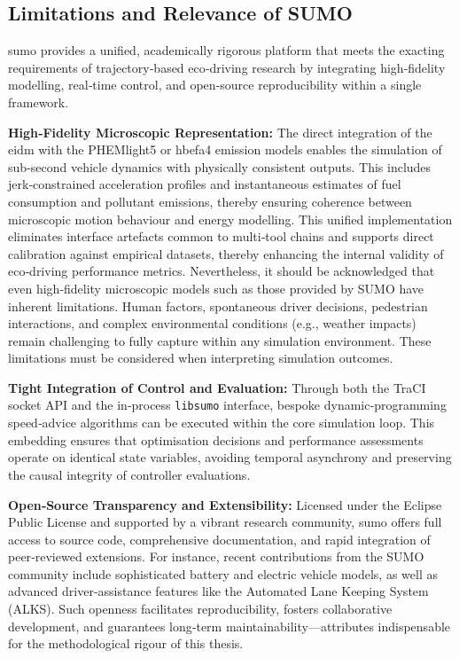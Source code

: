 \subsection{Limitations and Relevance of SUMO}
\label{subsec\:sumo\_limitation\_relevance}

\ac{sumo} provides a unified, academically rigorous platform that meets the exacting requirements of trajectory‐based eco‐driving research by integrating high‐fidelity modelling, real‐time control, and open‐source reproducibility within a single framework.

\textbf{High‐Fidelity Microscopic Representation:}
The direct integration of the \ac{eidm} with the PHEMlight5 or \ac{hbefa}4 emission models enables the simulation of sub‐second vehicle dynamics with physically consistent outputs. This includes jerk‐constrained acceleration profiles and instantaneous estimates of fuel consumption and pollutant emissions, thereby ensuring coherence between microscopic motion behaviour and energy modelling. This unified implementation eliminates interface artefacts common to multi‐tool chains and supports direct calibration against empirical datasets, thereby enhancing the internal validity of eco‐driving performance metrics. Nevertheless, it should be acknowledged that even high‐fidelity microscopic models such as those provided by SUMO have inherent limitations. Human factors, spontaneous driver decisions, pedestrian interactions, and complex environmental conditions (e.g., weather impacts) remain challenging to fully capture within any simulation environment. These limitations must be considered when interpreting simulation outcomes.

\textbf{Tight Integration of Control and Evaluation:}
Through both the TraCI socket API and the in‐process \texttt{libsumo} interface, bespoke dynamic‐programming speed‐advice algorithms can be executed within the core simulation loop. This embedding ensures that optimisation decisions and performance assessments operate on identical state variables, avoiding temporal asynchrony and preserving the causal integrity of controller evaluations.

\textbf{Open‐Source Transparency and Extensibility:}
Licensed under the Eclipse Public License and supported by a vibrant research community, \ac{sumo} offers full access to source code, comprehensive documentation, and rapid integration of peer‐reviewed extensions. For instance, recent contributions from the SUMO community include sophisticated battery and electric vehicle models, as well as advanced driver-assistance features like the Automated Lane Keeping System (ALKS). Such openness facilitates reproducibility, fosters collaborative development, and guarantees long‐term maintainability—attributes indispensable for the methodological rigour of this thesis.


